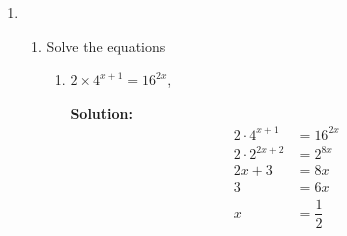 \documentclass{report}
\newcommand{\sol}{\vspace{0.2cm}\textbf{Solution:}\vspace{0.2cm}}
\begin{document}
\begin{multicols*}{2}
\begin{enumerate}[leftmargin=*]
\begin{enumerate}[label=(\roman*)]
                  \item $y=\sqrt{y+9}+3$,

                        \sol{}
                        \begin{align*}
                            y            & = \sqrt{y + 9} + 3 \\
                            y - 3        & = \sqrt{y + 9}     \\
                            y^2 - 6y + 9 & = y + 9            \\
                            y(y - 7)     & = 0                \\
                            y            & = 0 \text{ or } 7
                        \end{align*}
                  \item $2 \lg z=\lg (3 z+4)$.

                        \sol{}
                        \begin{align*}
                            2 \lg z        & = \lg (3z + 4)     \\
                            \lg z^2        & = \lg (3z + 4)     \\
                            z^2 - 3z       & = 4                \\
                            (z - 4)(z + 1) & = 0                \\
                            z              & = 4 \text{ or } -1
                        \end{align*}
                        Upon checking, $z=4$ is the only valid solution.
              \end{enumerate}

        \item \begin{enumerate}
                  \item  Solve the equations
                        \begin{enumerate}
                            \item $2 \times 4^{x+1}=16^{2 x}$,

                                  \sol{}
                                  \begin{align*}
                                      2 \cdot 4^{x+1}  & = 16^{2x}      \\
                                      2 \cdot 2^{2x+2} & = 2^{8x}       \\
                                      2x + 3           & = 8x           \\
                                      3                & = 6x           \\
                                      x                & = \dfrac{1}{2}
                                  \end{align*}


\end{enumerate}
\end{enumerate}
\end{enumerate}
\end{multicols*}
\end{document}
